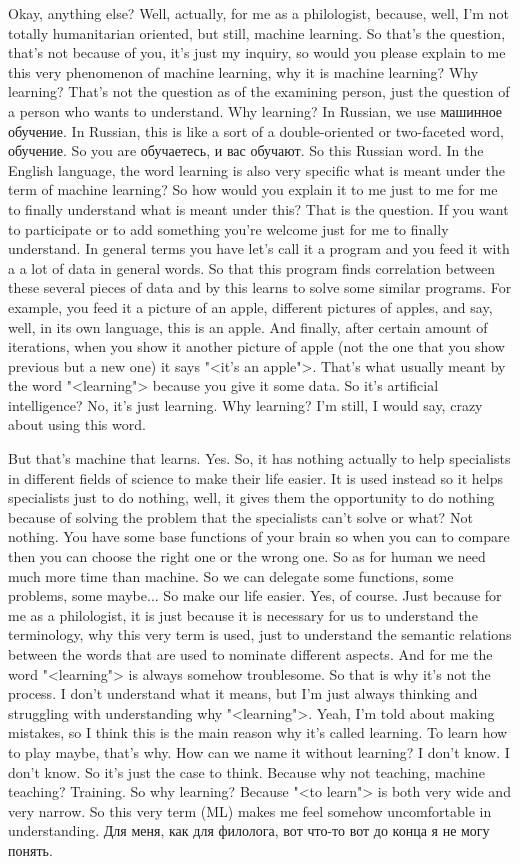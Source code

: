 \documentclass[main.tex]{subfiles}
\begin{document}
Okay, anything else?
Well, actually, for me as a philologist, because, well, I'm not totally humanitarian oriented, but still, machine learning.
So that's the question, that's not because of you, it's just my inquiry, so would you please explain to me this very phenomenon of machine learning, why it is machine learning?
Why learning?
That's not the question as of the examining person, just the question of a person who wants to understand.
Why learning?
In Russian, we use машинное обучение.
In Russian, this is like a sort of a double-oriented or two-faceted word, обучение.
So you are обучаетесь, и вас обучают.
So this Russian word.
In the English language, the word learning is also very specific what is meant under the term of machine learning?
So how would you explain it to me just to me for me to finally understand what is meant under this?
That is the question.
If you want to participate or to add something you're welcome just for me to finally understand.
In general terms you have let's call it a program and you feed it with a a lot of data in general words.
So that this program finds correlation between these several pieces of data and by this learns to solve some similar programs.
For example, you feed it a picture of an apple, different pictures of apples, and say, well, in its own language, this is an apple.
And finally, after certain amount of iterations, when you show it another picture of apple (not the one that you show previous but a new one) it says "<it's an apple">.
That's what usually meant by the word "<learning"> because you give it some data.
So it's artificial intelligence?
No, it's just learning.
Why learning?
I'm still, I would say, crazy about using this word.

But that's machine that learns.
Yes.
So, it has nothing actually to help specialists in different fields of science to make their life easier.
It is used instead so it helps specialists just to do nothing, well, it gives them the opportunity to do nothing because of solving the problem that the specialists can't solve or what?
Not nothing.
You have some base functions of your brain so when you can to compare then you can choose the right one or the wrong one.
So as for human we need much more time than machine.
So we can delegate some functions, some problems, some maybe...
So make our life easier.
Yes, of course.
Just because for me as a philologist, it is just because it is necessary for us to understand the terminology, why this very term is used, just to understand the semantic relations between the words that are used to nominate different aspects.
And for me the word "<learning"> is always somehow troublesome.
So that is why it's not the process.
I don't understand what it means, but I'm just always thinking and struggling with understanding why "<learning">.
Yeah, I'm told about making mistakes, so I think this is the main reason why it's called learning.
To learn how to play maybe, that's why.
How can we name it without learning?
I don't know.
I don't know.
So it's just the case to think.
Because why not teaching, machine teaching?
Training.
So why learning?
Because "<to learn"> is both very wide and very narrow.
So this very term (ML) makes me feel somehow uncomfortable in understanding.
Для меня, как для филолога, вот что-то вот до конца я не могу понять.
\end{document}

